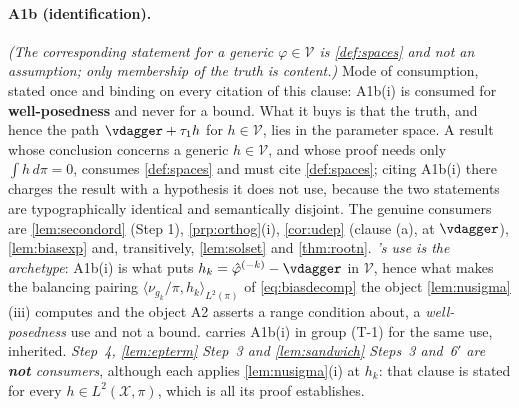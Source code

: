 \paragraph{A1b (identification).}

\emph{(The corresponding statement for a generic $\varphi\in\mathcal V$ is \cref{def:spaces} and not an
assumption; only membership of the truth is content.)}
Mode of consumption, stated once and binding on every citation of this clause: A1b(i) is consumed
for \textbf{well-posedness} and never for a bound. What it buys is that the truth, and hence the path
$\vdagger+\tau_1h$ for $h\in\mathcal V$, lies in the parameter space. A result whose conclusion
concerns a generic $h\in\mathcal V$, and whose proof needs only $\int h\,d\pi=0$, consumes
\cref{def:spaces} and must cite \cref{def:spaces}; citing A1b(i) there charges the result with a
hypothesis it does not use, because the two statements are typographically identical and semantically
disjoint. The genuine consumers are \cref{lem:secondord} \textup{(Step 1)}, \cref{prp:orthog}\textup{(i)},
\cref{cor:udep} \textup{(clause (a), at $\vdagger$)}, \cref{lem:biasexp} and, transitively,
\cref{lem:solset} and \cref{thm:rootn}.
\emph{'s use is the archetype}: A1b(i) is what puts
$h_k=\hat\varphi^{(-k)}-\vdagger$ in $\mathcal V$, hence what makes the balancing pairing
$\langle\nu_{g_k}/\pi,h_k\rangle_{L^{2}(\pi)}$ of \eqref{eq:biasdecomp} the object
\cref{lem:nusigma}\textup{(iii)} computes and the object A2 asserts a range condition about, a
\emph{well-posedness} use and not a bound.  carries
A1b(i) in group \textup{(T-1)} for the same use, inherited.
\emph{ Step~4, \cref{lem:epterm} Step~3 and \cref{lem:sandwich} Steps~3 and~6$'$
are \textbf{not} consumers}, although each applies \cref{lem:nusigma}\textup{(i)} at $h_k$:
that clause is stated for every $h\in L^{2}(\mathcal X,\pi)$, which is all its proof establishes.


